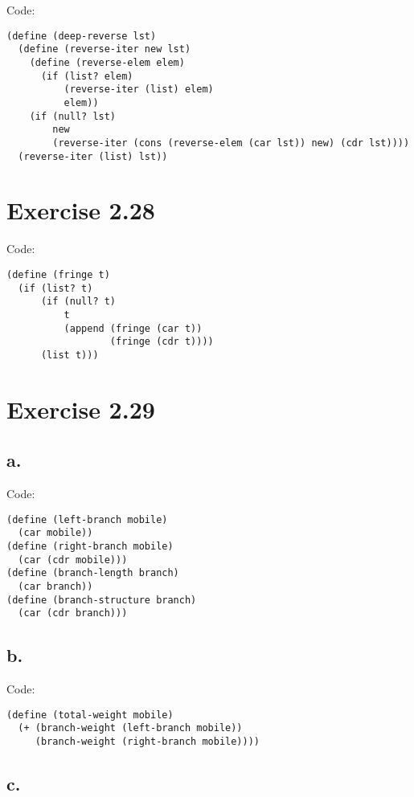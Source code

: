 \documentclass[../main.tex]{subfiles}
\begin{document}
Code:

\begin{lstlisting}
(define (deep-reverse lst)
  (define (reverse-iter new lst)
    (define (reverse-elem elem)
      (if (list? elem)
          (reverse-iter (list) elem)
          elem))
    (if (null? lst)
        new
        (reverse-iter (cons (reverse-elem (car lst)) new) (cdr lst))))
  (reverse-iter (list) lst))
\end{lstlisting}

\section{Exercise 2.28}

Code:

\begin{lstlisting}
(define (fringe t)
  (if (list? t)
      (if (null? t)
          t
          (append (fringe (car t))
                  (fringe (cdr t))))
      (list t)))
\end{lstlisting}

\section{Exercise 2.29}

\subsection{a.}

Code:

\begin{lstlisting}
(define (left-branch mobile)
  (car mobile))
(define (right-branch mobile)
  (car (cdr mobile)))
(define (branch-length branch)
  (car branch))
(define (branch-structure branch)
  (car (cdr branch)))
\end{lstlisting}

\subsection{b.}

Code:

\begin{lstlisting}
(define (total-weight mobile)
  (+ (branch-weight (left-branch mobile))
     (branch-weight (right-branch mobile))))
\end{lstlisting}

\subsection{c.}
\end{document}
